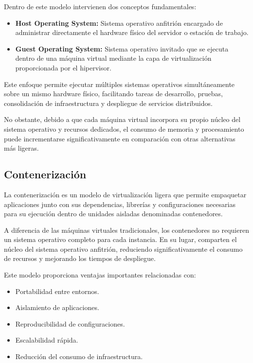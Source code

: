 \documentclass[12pt, oneside, letterpaper]{book}
\begin{document}
Dentro de este modelo intervienen dos conceptos fundamentales:

\begin{itemize}
\item \textbf{Host Operating System:} Sistema operativo anfitrión encargado de administrar directamente el hardware físico del servidor o estación de trabajo.

\item \textbf{Guest Operating System:} Sistema operativo invitado que se ejecuta dentro de una máquina virtual mediante la capa de virtualización proporcionada por el hipervisor.
\end{itemize}

Este enfoque permite ejecutar múltiples sistemas operativos simultáneamente sobre un mismo hardware físico, facilitando tareas de desarrollo, pruebas, consolidación de infraestructura y despliegue de servicios distribuidos.

No obstante, debido a que cada máquina virtual incorpora su propio núcleo del sistema operativo y recursos dedicados, el consumo de memoria y procesamiento puede incrementarse significativamente en comparación con otras alternativas más ligeras.

\subsection{Contenerización}

La contenerización es un modelo de virtualización ligera que permite empaquetar aplicaciones junto con sus dependencias, librerías y configuraciones necesarias para su ejecución dentro de unidades aisladas denominadas contenedores.

A diferencia de las máquinas virtuales tradicionales, los contenedores no requieren un sistema operativo completo para cada instancia. En su lugar, comparten el núcleo del sistema operativo anfitrión, reduciendo significativamente el consumo de recursos y mejorando los tiempos de despliegue.

Este modelo proporciona ventajas importantes relacionadas con:

\begin{itemize}
\item Portabilidad entre entornos.
\item Aislamiento de aplicaciones.
\item Reproducibilidad de configuraciones.
\item Escalabilidad rápida.
\item Reducción del consumo de infraestructura.
\end{itemize}
\end{document}
